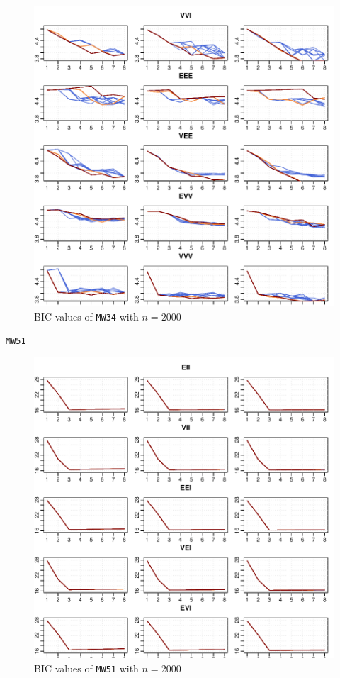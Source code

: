 \begin{figure}[h!]
    \centering
\includegraphics{App_plots-figmw21bicsecond}
    \caption{BIC values of {\tt MW34} with $n=2000$}
    \label{fig:bicmw34second}
\end{figure}

{\tt MW51}

\begin{figure}[h!]
    \centering
\includegraphics{App_plots-figmw51bicfirst}
    \caption{BIC values of {\tt MW51} with $n=2000$}
    \label{fig:bicmw34first}
\end{figure}

